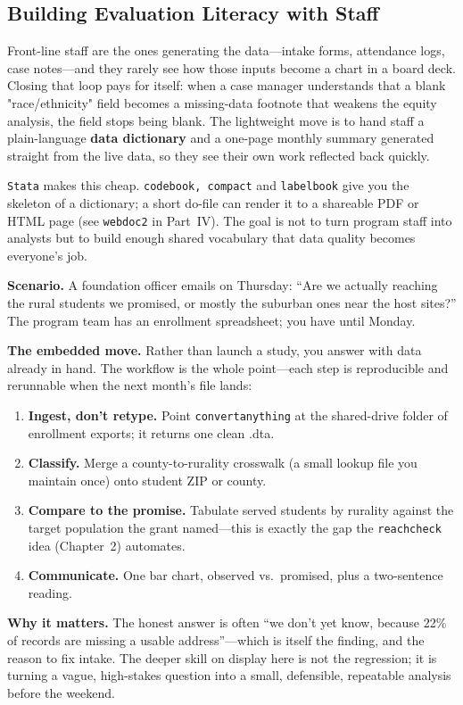 \documentclass[
    a4paper,
    fontsize=10pt,
    twoside=true,
    numbers=noenddot,
]{kaobook}
\providecommand{\Environment}[1]{\texttt{#1}}
\providecommand{\Option}[1]{\textsf{#1}}
\newcounter{appliedexample}
\newenvironment{appliedexample}[1][]{%
    \refstepcounter{appliedexample}%
    \begin{appliedexamplebox}[frametitle={Applied Example~\theappliedexample.~~#1}]%
}{%
    \end{appliedexamplebox}%
}
\begin{document}
\subsection{Building Evaluation Literacy with Staff}
Front-line staff are the ones generating the data---intake forms, attendance logs, case notes---and they rarely see how those inputs become a chart in a board deck. Closing that loop pays for itself: when a case manager understands that a blank "race/ethnicity" field becomes a missing-data footnote that weakens the equity analysis, the field stops being blank. The lightweight move is to hand staff a plain-language \textbf{data dictionary} and a one-page monthly summary generated straight from the live data, so they see their own work reflected back quickly.

\Environment{Stata} makes this cheap. \texttt{codebook, compact} and \texttt{labelbook} give you the skeleton of a dictionary; a short do-file can render it to a shareable PDF or HTML page (see \texttt{webdoc2} in Part~IV). The goal is not to turn program staff into analysts but to build enough shared vocabulary that data quality becomes everyone's job.

\begin{appliedexample}[From a Funder's Question to a One-Page Answer]
\textbf{Scenario.} A foundation officer emails on Thursday: \enquote{Are we actually reaching the rural students we promised, or mostly the suburban ones near the host sites?} The program team has an enrollment spreadsheet; you have until Monday.

\medskip
\textbf{The embedded move.} Rather than launch a study, you answer with data already in hand. The workflow is the whole point---each step is reproducible and rerunnable when the next month's file lands:
\begin{enumerate}
    \item \textbf{Ingest, don't retype.} Point \texttt{convertanything} at the shared-drive folder of enrollment exports; it returns one clean \Option{.dta}.
    \item \textbf{Classify.} Merge a county-to-rurality crosswalk (a small lookup file you maintain once) onto student ZIP or county.
    \item \textbf{Compare to the promise.} Tabulate served students by rurality against the target population the grant named---this is exactly the gap the \texttt{reachcheck} idea (Chapter~2) automates.
    \item \textbf{Communicate.} One bar chart, observed vs.\ promised, plus a two-sentence reading.
\end{enumerate}

\medskip
\textbf{Why it matters.} The honest answer is often \enquote{we don't yet know, because 22\% of records are missing a usable address}---which is itself the finding, and the reason to fix intake. The deeper skill on display here is not the regression; it is turning a vague, high-stakes question into a small, defensible, repeatable analysis before the weekend.
\end{appliedexample}
\end{document}
